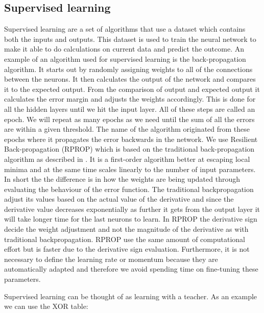 \subsection{Supervised learning}
Supervised learning are a set of algorithms that use a dataset which contains both the inputs and outputs. This dataset is used to train the neural network to make it able to do calculations on current data and predict the outcome. An example of an algorithm used for supervised learning is the back-propagation algorithm. 
It starts out by randomly assigning weights to all of the connections between the neurons. It then calculates the output of the network and compares it to the expected output. From the comparison of output and expected output it calculates the error margin and adjusts the weights accordingly. This is done for all the hidden layers until we hit the input layer. All of these steps are called an epoch. We will repeat as many epochs as we need until the sum of all the errors are within a given threshold. The name of the algorithm originated from these epochs where it propagates the error backwards in the network. We use Resilient Back-propagation (RPROP) which is based on the traditional back-propagation algorithm as described in \cite{rpropForGeometricDilution,adaptiveRprop}. It is a first-order algorithm better at escaping local minima and at the same time scales linearly to the number of input parameters. In short the the difference is in how the weights are being updated through evaluating the behaviour of the error function. The traditional backpropagation adjust its values based on the actual value of the derivative and since the derivative value decreases exponentially as further it gets from the output layer it will take longer time for the last neurons to learn. In RPROP the derivative sign decide the weight adjustment and not the magnitude of the derivative as with traditional backpropagation. RPROP use the same amount of computational effort but is faster due to the derivative sign evaluation. Furthermore, it is not necessary to define the learning rate or momentum because they are automatically adapted and therefore we avoid spending time on fine-tuning these parameters.

Supervised learning can be thought of as learning with a teacher. As an example we can use the XOR table:

